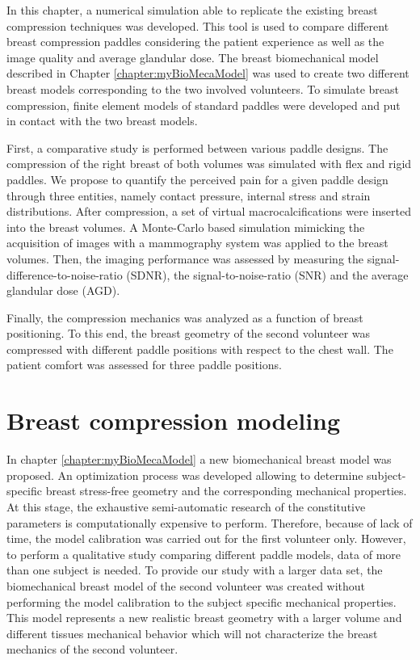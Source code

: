 
In this chapter, a numerical simulation able to replicate the existing breast compression techniques was developed. This tool is used to compare different breast compression paddles considering the patient experience as well as the image quality and average glandular dose. The breast biomechanical model described  in Chapter \ref{chapter:myBioMecaModel} was used to create two different breast models corresponding to the two involved volunteers. To simulate breast compression, finite element models of standard paddles were developed and put in contact with the two breast models.

First, a comparative study is performed between various paddle designs. The compression of the right breast of both volumes was simulated with flex and rigid paddles. We propose to quantify the perceived pain for a given paddle design through three entities, namely contact pressure, internal stress and strain distributions. After compression, a set of virtual macrocalcifications were inserted into the breast volumes. A Monte-Carlo based simulation mimicking the acquisition of images with a mammography system was applied to the breast volumes. Then, the imaging performance was assessed by measuring the signal-difference-to-noise-ratio (SDNR), the signal-to-noise-ratio (SNR) and the average glandular dose (AGD).

Finally, the compression mechanics was analyzed as a function of breast positioning. To this end, the breast geometry of the second volunteer was compressed with different paddle positions with respect to the chest wall. The patient comfort was assessed for three paddle positions. 

 

\clearpage


\section{Breast compression modeling}
In chapter \ref{chapter:myBioMecaModel} a new biomechanical breast model was proposed. An optimization process was developed allowing to determine subject-specific breast stress-free geometry and the corresponding mechanical properties. At this stage, the exhaustive semi-automatic research of the constitutive parameters is computationally expensive to perform. Therefore, because of lack of time, the model calibration was carried out for the first volunteer only. However, to perform a qualitative study comparing different paddle models, data of more than one subject is needed. To provide our study with a larger data set, the biomechanical breast model of the second volunteer was created without performing the model calibration to the subject specific mechanical properties. This model represents a new realistic breast geometry with a larger volume and different tissues mechanical behavior which will not characterize the breast mechanics of the second volunteer.

